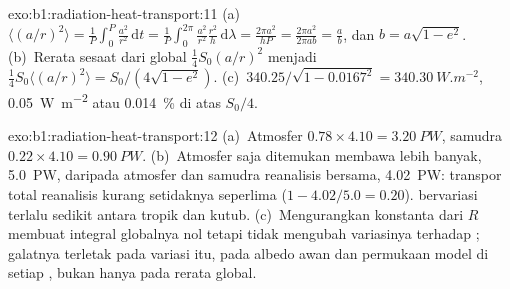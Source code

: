 \begin{solution}{exo:b1:radiation-heat-transport:11}
(a)~$\langle (a/r)^2\rangle = \frac1P\int_0^P \frac{a^2}{r^2}\,\mathrm dt =
\frac1P\int_0^{2\pi}\frac{a^2}{r^2}\frac{r^2}{h}\,\mathrm d\lambda = \frac{2\pi
a^2}{hP} = \frac{2\pi a^2}{2\pi a b} = \frac ab$, dan $b = a\sqrt{1-e^2}$.
(b)~Rerata sesaat dari global $\frac14 S_0(a/r)^2$ menjadi $\frac14 S_0
\langle(a/r)^2\rangle = S_0/(4\sqrt{1-e^2})$. (c)~$340.25/\sqrt{1 - 0.0167^2} =
\qty{340.30}{W.m^{-2}}$, \qty{0.05}{W.m^{-2}} atau \qty{0.014}{\percent} di atas
$S_0/4$.
\end{solution}

\begin{solution}{exo:b1:radiation-heat-transport:12}
(a)~Atmosfer $0.78 \times 4.10 = \qty{3.20}{PW}$, samudra $0.22 \times 4.10 =
\qty{0.90}{PW}$. (b)~Atmosfer saja ditemukan membawa lebih banyak, \qty{5.0}{PW},
daripada atmosfer dan samudra reanalisis bersama, \qty{4.02}{PW}: transpor total
reanalisis kurang setidaknya seperlima ($1 - 4.02/5.0 = 0.20$).
 bervariasi terlalu sedikit antara tropik dan kutub. (c)~Mengurangkan
konstanta dari $R$ membuat integral globalnya nol tetapi tidak mengubah variasinya terhadap
; galatnya terletak pada variasi itu, pada albedo awan dan permukaan model di setiap
, bukan hanya pada rerata global.
\end{solution}

